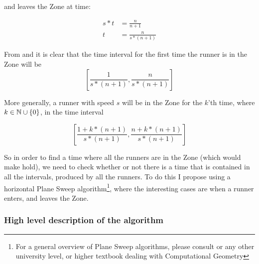 and leaves the Zone at time:

\begin{equation}
\label{eqa:speedTwo}
\begin{split}
s * t &= \frac{n}{n+1} \\
t &= \frac{n}{s * (n+1)}
\end{split}
\end{equation}

From  and  it is clear that the time interval for the first time the runner is in the Zone will be 
\begin{displaymath}
\left[\frac{1}{s * (n+1)}, \frac{n}{s * (n+1)}\right]
\end{displaymath}

More generally, a runner with speed $s$ will be in the Zone for the $k$'th time, where $k \in \mathbb{N} \cup \{0\}$, in the time interval 

\begin{equation}
\label{eqa:genericZone}
\left[\frac{1 + k * (n+1)}{s * (n+1)}, \frac{n + k * (n+1)}{s * (n+1)}\right] 
\end{equation}

So in order to find a time where all the runners are in the Zone (which would make  hold), we need to check whether or not there is a time that is contained in all the intervals, produced by all the runners. To do this I propose using a horizontal Plane Sweep algorithm\footnote{For a general overview of Plane Sweep algorithms, please consult \cite{citeulike:3347056} or any other university level, or higher textbook dealing with Computational Geometry}, where the interesting cases are when a runner enters, and leaves the Zone. 

\subsubsection{High level description of the algorithm}

